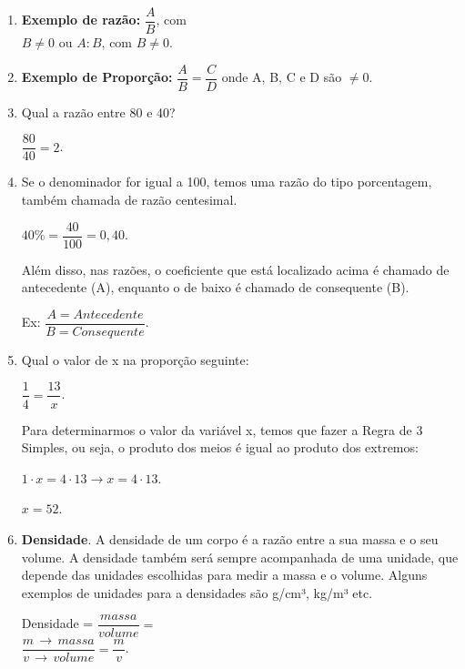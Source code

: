 \begin{multicols*}{2}
	\begin{enumerate}[wide, labelwidth=!, labelindent=0pt]

		\item \textbf{Exemplo de razão:}  {$ \dfrac{A}{B} $}, com\\

		      {$B \neq 0 $}	 ou {$ A : B $}, com {$ B \neq 0 $}.

		\item \textbf{Exemplo de Proporção:} {$ \dfrac{A}{B} = \dfrac{C}{D} $}	onde A, B, C e D são $\neq 0$.

		\item Qual a razão entre 80 e 40?

		      {$ \dfrac{80}{40} = 2 $}.

		\item Se o denominador for igual a 100, temos uma razão do tipo porcentagem, também chamada de razão centesimal.

			      {$ 40\% = \dfrac{40}{100} = 0,40 $}.

		      Além disso, nas razões, o coeficiente que está localizado acima é chamado de antecedente (A), enquanto o de baixo é chamado de consequente (B).

		      Ex: {$ \dfrac{A = Antecedente}{B = Consequente} $}.

		\item Qual o valor de x na proporção seguinte:

		      {$ \dfrac{1}{4} = \dfrac{13}{x} $}.

		      Para determinarmos o valor da variável x, temos que fazer a Regra de 3 Simples, ou seja, o produto dos meios é igual ao produto dos extremos:

		      {$ 1 \cdot x = 4 \cdot 13 \to x = 4 \cdot 13 $}.

		      {$ x = 52 $}.

		\item \textbf{Densidade}. A densidade de um corpo é a razão entre a sua massa e o seu volume. A densidade também será sempre acompanhada de uma unidade, que depende das unidades escolhidas para medir a massa e o volume. Alguns exemplos de unidades para a densidades são g/cm³, kg/m³ etc.

		      Densidade = {$ \dfrac{massa}{volume} =$}\\

		      {$\dfrac{m \, \to \, massa}{v \, \to \, volume} = \dfrac{m}{v} $}.\\


\end{enumerate}
\end{multicols*}

